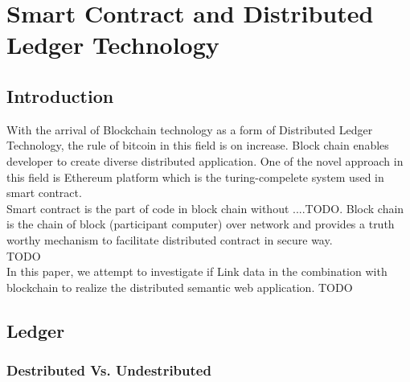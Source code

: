 \chapter{Smart Contract and Distributed Ledger Technology}

\section{Introduction}
With the arrival of Blockchain technology as a form of Distributed Ledger Technology, the rule of bitcoin in this field is on increase.  Block chain enables developer to create diverse distributed application. One of the novel approach in this field is Ethereum platform which is the turing-compelete system used in smart contract.\\
Smart contract is the part of code in block chain without ....TODO.
Block chain is the chain of block (participant computer) over network and provides a truth worthy mechanism to facilitate distributed contract in secure way.\\
TODO
\\
In this paper, we attempt to investigate if Link data in the combination with blockchain to realize the distributed semantic web application.
 TODO 
 \section{Ledger}
 \subsection{Destributed Vs. Undestributed }
 
